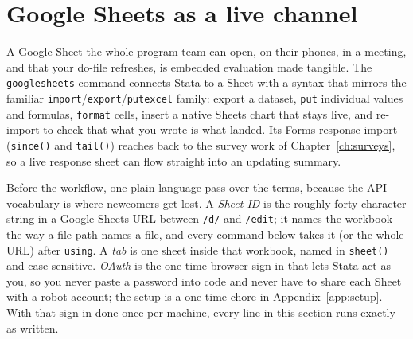 \documentclass[
    a4paper,
    fontsize=10pt,
    twoside=true,
    numbers=noenddot,
]{kaobook}
\begin{document}
\section{Google Sheets as a live channel}\label{sec:googlesheets}
A Google Sheet the whole program team can open, on their phones, in a meeting, and that your do-file refreshes, is embedded evaluation made tangible. The \texttt{googlesheets} command connects Stata to a Sheet with a syntax that mirrors the familiar \texttt{import}/\texttt{export}/\texttt{putexcel} family: export a dataset, \texttt{put} individual values and formulas, \texttt{format} cells, insert a native Sheets chart that stays live, and re-import to check that what you wrote is what landed. Its Forms-response import (\texttt{since()} and \texttt{tail()}) reaches back to the survey work of Chapter~\ref{ch:surveys}, so a live response sheet can flow straight into an updating summary.

Before the workflow, one plain-language pass over the terms, because the API vocabulary is where newcomers get lost. A \emph{Sheet ID} is the roughly forty-character string in a Google Sheets URL between \texttt{/d/} and \texttt{/edit}; it names the workbook the way a file path names a file, and every command below takes it (or the whole URL) after \texttt{using}. A \emph{tab} is one sheet inside that workbook, named in \texttt{sheet()} and case-sensitive. \emph{OAuth} is the one-time browser sign-in that lets Stata act as you, so you never paste a password into code and never have to share each Sheet with a robot account; the setup is a one-time chore in Appendix~\ref{app:setup}. With that sign-in done once per machine, every line in this section runs exactly as written.
\end{document}
